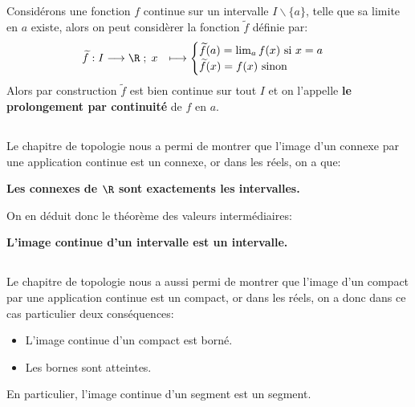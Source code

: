 \subsection*{}

Considérons une fonction \(f\) continue sur un intervalle \(I \backslash \{a\}\), telle que sa limite en \(a\) existe, alors on peut considèrer la fonction \(\widetilde{f}\) définie par:
\[
   \begin{aligned}
      \widetilde{f}: I &\longrightarrow \R \; ; \; x &\longmapsto \begin{cases}
         \widetilde{f}(a) = \lim_{a} f(x) \text{ si } x = a\\
         \widetilde{f}(x) = f(x) \text{ sinon}
      \end{cases}
   \end{aligned}
\]
Alors par construction \(\widetilde{f}\) est bien continue sur tout \(I\) et on l'appelle \textbf{le prolongement par continuité} de \(f\) en \(a\).
\subsection*{}
Le chapitre de topologie nous a permi de montrer que l'image d'un connexe par une application continue est un connexe, or dans les réels, on a que:
\begin{center}
   \textbf{Les connexes de \(\R\) sont exactements les intervalles.}
\end{center}
On en déduit donc le théorème des valeurs intermédiaires:
\begin{center}
   \textbf{L'image continue d'un intervalle est un intervalle.}
\end{center}
\subsection*{}
Le chapitre de topologie nous a aussi permi de montrer que l'image d'un compact par une application continue est un compact, or dans les réels, on a donc dans ce cas particulier deux conséquences:
\begin{itemize}
   \item L'image continue d'un compact est borné.
   \item Les bornes sont atteintes.
\end{itemize}
En particulier, l'image continue d'un segment est un segment.
